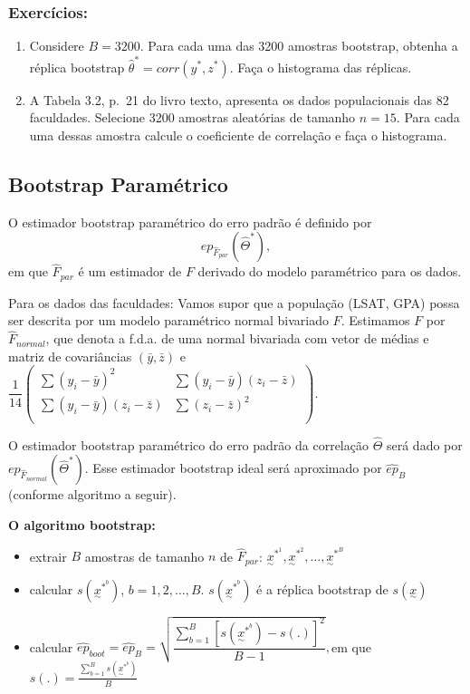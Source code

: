 \documentclass[
  letterpaper,
  DIV=11,
  numbers=noendperiod]{scrreprt}
\providecommand{\tightlist}{%
  \setlength{\itemsep}{0pt}\setlength{\parskip}{0pt}}\usepackage{longtable,booktabs,array}
\begin{document}
\subsubsection{Exercícios:}\label{exercuxedcios-9}

\begin{enumerate}
\def\labelenumi{(\arabic{enumi})}
\item
  Considere \(B = 3200\). Para cada uma das 3200 amostras bootstrap,
  obtenha a réplica bootstrap \(\hat{\theta}^*=corr(y^*,z^*)\). Faça o
  histograma das réplicas.
\item
  A Tabela 3.2, p.~21 do livro texto, apresenta os dados populacionais
  das 82 faculdades. Selecione 3200 amostras aleatórias de tamanho
  \(n = 15\). Para cada uma dessas amostra calcule o coeficiente de
  correlação e faça o histograma.
\end{enumerate}

\subsection{Bootstrap Paramétrico}\label{bootstrap-paramuxe9trico}

O estimador bootstrap paramétrico do erro padrão é definido por
\[ep_{\hat{F}_{par}}(\hat\Theta^*),\] em que \(\hat{F}_{par}\) é um
estimador de \(F\) derivado do modelo paramétrico para os dados.

Para os dados das faculdades: Vamos supor que a população (LSAT, GPA)
possa ser descrita por um modelo paramétrico normal bivariado \(F\).
Estimamos \(F\) por \(\hat{F}_{normal}\), que denota a f.d.a. de uma
normal bivariada com vetor de médias e matriz de covariâncias
\((\bar{y},\bar{z})\) e \(\dfrac{1}{14}\left(
\begin{array}{ll}
\sum(y_i-\bar{y})^2            &  \sum(y_i-\bar{y})(z_i-\bar{z}) \\
\sum(y_i-\bar{y})(z_i-\bar{z}) &  \sum(z_i-\bar{z})^2  \\
\end{array}
\right)\).

O estimador bootstrap paramétrico do erro padrão da correlação
\(\hat{\Theta}\) será dado por \(ep_{\hat{F}_{normal}}(\hat\Theta^*)\).
Esse estimador bootstrap ideal será aproximado por \(\hat{ep}_{B}\)
(conforme algoritmo a seguir).

\textbf{O algoritmo bootstrap:}

\begin{itemize}
\tightlist
\item
  extrair \(B\) amostras de tamanho \(n\) de \(\hat{F}_{par}\):
  \(\underset{\sim}{x}^{*^{1}}, \underset{\sim}{x}^{*^{2}}, \ldots, \underset{\sim}{x}^{*^{B}}\)
\item
  calcular \(s(\underset{\sim}{x}^{*^{b}})\), \(b=1, 2, \ldots, B\).
  \(s(\underset{\sim}{x}^{*^{b}})\) é a réplica bootstrap de
  \(s(\underset{\sim}{x})\)
\item
  calcular
  \(\hat{ep}_{boot}=\hat{ep}_{B}=\sqrt{ \dfrac{\sum_{b=1}^{B}[s(\underset{\sim}{x}^{*^{b}})-s(.)]^2}{B-1}},\)em
  que \(s(.)=\frac{\sum_{b=1}^{B}s(\underset{\sim}{x}^{*^{b}})}{B}\)
\end{itemize}
\end{document}
